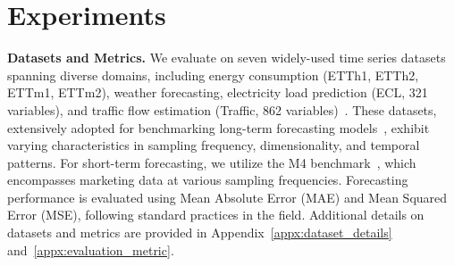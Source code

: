 \section{Experiments}





\noindent\textbf{Datasets and Metrics.} We evaluate \method on seven widely-used time series datasets spanning diverse domains, including energy consumption (ETTh1, ETTh2, ETTm1, ETTm2), weather forecasting, electricity load prediction (ECL, 321 variables), and traffic flow estimation (Traffic, 862 variables)~\cite{zhou2021informer, lai2018modeling}. These datasets, extensively adopted for benchmarking long-term forecasting models~\cite{wu2022timesnet}, exhibit varying characteristics in sampling frequency, dimensionality, and temporal patterns. For short-term forecasting, we utilize the M4 benchmark~\citep{makridakis2018m4}, which encompasses marketing data at various sampling frequencies. Forecasting performance is evaluated using Mean Absolute Error (MAE) and Mean Squared Error (MSE), following standard practices in the field. Additional details on datasets and metrics are provided in Appendix~\ref{appx:dataset_details} and~\ref{appx:evaluation_metric}.



